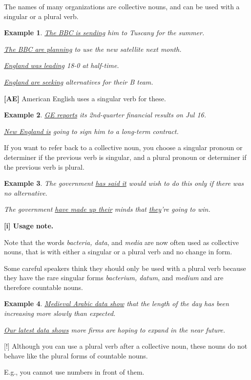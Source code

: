 \documentclass[oneside]{book}
\numberwithin{equation}{section}
\newtheorem{example}{Example}[section]
\begin{document}
%
The names of many organizations are collective nouns, and can be used with a singular or a plural verb.
\begin{example}
    \underline{The BBC is sending} him to Tuscany for the summer.
    
    \underline{The BBC are planning} to use the new satellite next month.
    
    \underline{England was leading} 18-0 at half-time.
    
    \underline{England are seeking} alternatives for their B team.
\end{example}
\textbf{[AE]} American English uses a singular verb for these.
\begin{example}
    \underline{GE reports} its 2nd-quarter financial results on Jul 16.
    
    \underline{New England is} going to sign him to a long-term contract.
\end{example}
If you want to refer back to a collective noun, you choose a singular pronoun or determiner if the previous verb is singular, and a plural pronoun or determiner if the previous verb is plural.
\begin{example}
    The government \underline{has said it} would wish to do this only if there was no alternative.
    
    The government \underline{have made up their} minds that \underline{they}'re going to win.
\end{example}
\textbf{[i] Usage note.}

%
\noindent{} Note that the words \textit{bacteria, data}, and \textit{media} are now often used as collective nouns, that is with either a singular or a plural verb and no change in form.

Some careful speakers think they should only be used with a plural verb because they have the rare singular forms \textit{bacterium, datum}, and \textit{medium} and are therefore countable nouns.
\begin{example}
    \underline{Medieval Arabic data show} that the length of the day has been increasing more slowly than expected.
    
    \underline{Our latest data shows} more firms are hoping to expand in the near future.
\end{example}
%
\noindent{} [!] Although you can use a plural verb after a collective noun, these nouns do not behave like the plural forms of countable nouns.

E.g., you cannot use numbers in front of them.
\end{document}
